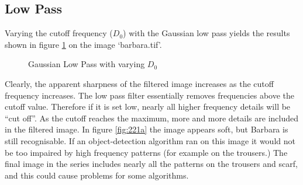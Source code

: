 \documentclass{article}
\begin{document}
\subsection*{Low Pass}
Varying the cutoff frequency ($D_0$) with the Gaussian low pass yields the results shown in figure \ref{fig:q221} on the image `barbara.tif'.
\begin{figure}[h]
\centering
	\qquad
	\qquad
	\qquad
	\qquad
	\caption{Gaussian Low Pass with varying $D_0$}
	\label{fig:q221}
\end{figure}
Clearly, the apparent sharpness of the filtered image increases as the cutoff frequency increases. The low pass filter essentially removes frequencies above the cutoff value. Therefore if it is set low, nearly all higher frequency details will be ``cut off''. As the cutoff reaches the maximum, more and more details are included in the filtered image.
In figure \ref{fig:221a} the image appears soft, but Barbara is still recognisable. If an object-detection algorithm ran on this image it would not be too impaired by high frequency patterns (for example on the trousers.) The final image in the series includes nearly all the patterns on the trousers and scarf, and this could cause problems for some algorithms.
\end{document}
